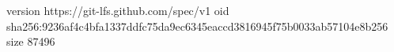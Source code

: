 version https://git-lfs.github.com/spec/v1
oid sha256:9236af4c4bfa1337ddfc75da9ec6345eaccd3816945f75b0033ab57104e8b256
size 87496
